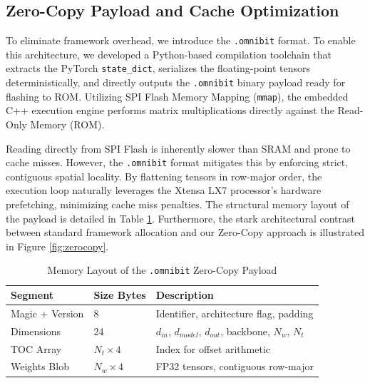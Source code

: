 \documentclass[conference]{IEEEtran}
\begin{document}
\subsection{Zero-Copy Payload and Cache Optimization}
To eliminate framework overhead, we introduce the \texttt{.omnibit} format. To enable this architecture, we developed a Python-based compilation toolchain that extracts the PyTorch \texttt{state\_dict}, serializes the floating-point tensors deterministically, and directly outputs the \texttt{.omnibit} binary payload ready for flashing to ROM. Utilizing SPI Flash Memory Mapping (\texttt{mmap}), the embedded C++ execution engine performs matrix multiplications directly against the Read-Only Memory (ROM). 

Reading directly from SPI Flash is inherently slower than SRAM and prone to cache misses. However, the \texttt{.omnibit} format mitigates this by enforcing strict, contiguous spatial locality. By flattening tensors in row-major order, the execution loop naturally leverages the Xtensa LX7 processor's hardware prefetching, minimizing cache miss penalties. The structural memory layout of the payload is detailed in Table \ref{tab:omnibit_layout}. Furthermore, the stark architectural contrast between standard framework allocation and our Zero-Copy approach is illustrated in Figure \ref{fig:zerocopy}.

\begin{table}[h]
\centering
\caption{Memory Layout of the \texttt{.omnibit} Zero-Copy Payload}
\label{tab:omnibit_layout}
\begin{tabular}{|l|l|l|}
\hline
\textbf{Segment} & \textbf{Size Bytes} & \textbf{Description} \\ \hline
Magic + Version & 8 & Identifier, architecture flag, padding \\ \hline
Dimensions & 24 & $d_{in}$, $d_{model}$, $d_{out}$, backbone, $N_{w}$, $N_{t}$ \\ \hline
TOC Array & $N_{t} \times 4$ & Index for offset arithmetic \\ \hline
Weights Blob & $N_{w} \times 4$ & FP32 tensors, contiguous row-major \\ \hline
\end{tabular}
\end{table}
\end{document}
